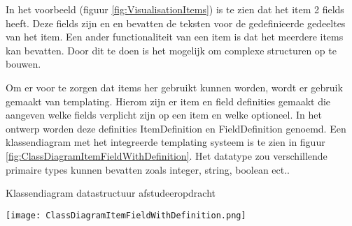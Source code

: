 \whitespace
In het voorbeeld (figuur \ref{fig:VisualisationItems}) is te zien dat het item  2 fields heeft.
Deze fields zijn  en  en bevatten de teksten voor de gedefinieerde gedeeltes van het item.
Een ander functionaliteit van een item is dat het meerdere items kan bevatten. 
Door dit te doen is het mogelijk om complexe structuren op te bouwen.

%

\whitespace
Om er voor te zorgen dat items her gebruikt kunnen worden, wordt er gebruik gemaakt van templating.
Hierom zijn er item en field definities gemaakt die aangeven welke fields verplicht zijn op een item en welke optioneel.
In het ontwerp worden deze definities ItemDefinition en FieldDefinition genoemd.
Een klassendiagram met het integreerde templating systeem is te zien in figuur \ref{fig:ClassDiagramItemFieldWithDefinition}.
Het datatype  zou verschillende primaire types kunnen bevatten zoals integer, string, boolean ect..

\whitespace[2]
\begin{graphic}
    \captionsetup{type=figure}
    \caption{Klassendiagram datastructuur afstudeeropdracht}
    \texttt{[image: ClassDiagramItemFieldWithDefinition.png]}
    \label{fig:ClassDiagramItemFieldWithDefinition}
\end{graphic}

